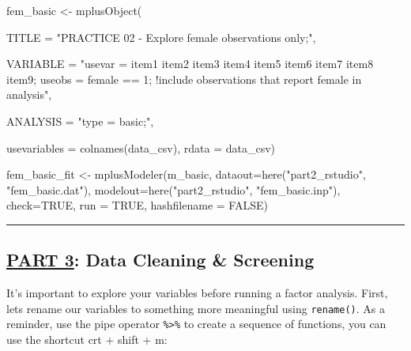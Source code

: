 \documentclass[
]{article}
\newenvironment{Shaded}{\begin{snugshade}}{\end{snugshade}}
\newcommand{\AttributeTok}[1]{\textcolor[rgb]{0.77,0.63,0.00}{#1}}
\newcommand{\ConstantTok}[1]{\textcolor[rgb]{0.00,0.00,0.00}{#1}}
\newcommand{\FunctionTok}[1]{\textcolor[rgb]{0.00,0.00,0.00}{#1}}
\newcommand{\NormalTok}[1]{#1}
\newcommand{\OtherTok}[1]{\textcolor[rgb]{0.56,0.35,0.01}{#1}}
\newcommand{\StringTok}[1]{\textcolor[rgb]{0.31,0.60,0.02}{#1}}
\begin{document}
\begin{Shaded}
\begin{Highlighting}[]
\NormalTok{fem\_basic  }\OtherTok{\textless{}{-}} \FunctionTok{mplusObject}\NormalTok{(}
  
  \AttributeTok{TITLE =} \StringTok{"PRACTICE 02 {-} Explore female observations only;"}\NormalTok{, }
  
  \AttributeTok{VARIABLE =} 
  \StringTok{"usevar = item1 item2 item3 item4 item5 item6 item7 item8 item9;}
\StringTok{  useobs = female == 1; !include observations that report female in analysis"}\NormalTok{,}
  
  \AttributeTok{ANALYSIS =} 
    \StringTok{"type = basic;"}\NormalTok{,}
 
  \AttributeTok{usevariables =} \FunctionTok{colnames}\NormalTok{(data\_csv), }
  \AttributeTok{rdata =}\NormalTok{ data\_csv)}

\NormalTok{fem\_basic\_fit }\OtherTok{\textless{}{-}} \FunctionTok{mplusModeler}\NormalTok{(m\_basic, }
               \AttributeTok{dataout=}\FunctionTok{here}\NormalTok{(}\StringTok{"part2\_rstudio"}\NormalTok{, }\StringTok{"fem\_basic.dat"}\NormalTok{),}
               \AttributeTok{modelout=}\FunctionTok{here}\NormalTok{(}\StringTok{"part2\_rstudio"}\NormalTok{, }\StringTok{"fem\_basic.inp"}\NormalTok{),}
               \AttributeTok{check=}\ConstantTok{TRUE}\NormalTok{, }\AttributeTok{run =} \ConstantTok{TRUE}\NormalTok{, }\AttributeTok{hashfilename =} \ConstantTok{FALSE}\NormalTok{)}
\end{Highlighting}
\end{Shaded}

\begin{center}\rule{0.5\linewidth}{0.5pt}\end{center}

\hypertarget{part-3-data-cleaning-screening}{%
\subsection{\texorpdfstring{\underline{PART 3}: Data Cleaning \&
Screening}{PART 3: Data Cleaning \& Screening}}\label{part-3-data-cleaning-screening}}

It's important to explore your variables before running a factor
analysis. First, lets rename our variables to something more meaningful
using \texttt{rename()}. As a reminder, use the pipe operator
\texttt{\%\textgreater{}\%} to create a sequence of functions, you can
use the shortcut crt + shift + m:
\end{document}
